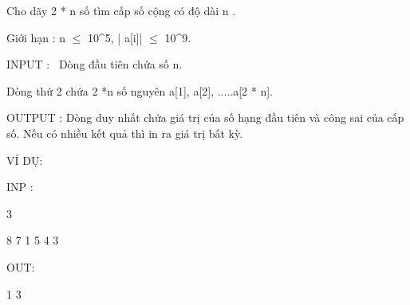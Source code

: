 



   Cho dãy 2 * n số tìm cấp số cộng có độ dài n .  

   Giới hạn : n  $\le$  10\textasciicircum5, | a[i]|  $\le$  10\textasciicircum9.  

   INPUT :  Dòng đầu tiên chứa số n.  

   Dòng thứ 2 chứa 2 *n số nguyên a[1], a[2], .....a[2 * n].  

   OUTPUT : Dòng duy nhất chứa giá trị của số hạng đầu tiên và công sai của cấp số. Nếu có nhiều kết quả thì in ra giá trị bất kỳ.  

   VÍ DỤ:  

   INP :  

   3  

   8 7 1 5 4 3  

   OUT:  

   1 3  
